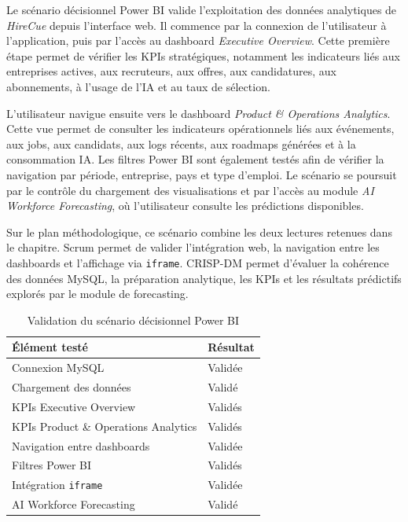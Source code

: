 Le scénario décisionnel Power BI valide l'exploitation des données analytiques de \textit{HireCue} depuis l'interface web. Il commence par la connexion de l'utilisateur à l'application, puis par l'accès au dashboard \textit{Executive Overview}. Cette première étape permet de vérifier les KPIs stratégiques, notamment les indicateurs liés aux entreprises actives, aux recruteurs, aux offres, aux candidatures, aux abonnements, à l'usage de l'IA et au taux de sélection.

L'utilisateur navigue ensuite vers le dashboard \textit{Product \& Operations Analytics}. Cette vue permet de consulter les indicateurs opérationnels liés aux événements, aux jobs, aux candidats, aux logs récents, aux roadmaps générées et à la consommation IA. Les filtres Power BI sont également testés afin de vérifier la navigation par période, entreprise, pays et type d'emploi. Le scénario se poursuit par le contrôle du chargement des visualisations et par l'accès au module \textit{AI Workforce Forecasting}, où l'utilisateur consulte les prédictions disponibles.

Sur le plan méthodologique, ce scénario combine les deux lectures retenues dans le chapitre. Scrum permet de valider l'intégration web, la navigation entre les dashboards et l'affichage via \texttt{iframe}. CRISP-DM permet d'évaluer la cohérence des données MySQL, la préparation analytique, les KPIs et les résultats prédictifs explorés par le module de forecasting.

\begin{table}[H]
\centering
\small
\renewcommand{\arraystretch}{1.3}
\begin{tabular}{|p{7cm}|p{5cm}|}
\hline
\rowcolor{headerblue}
\textbf{Élément testé} & \textbf{Résultat} \\
\hline
Connexion MySQL & Validée \\
\hline
Chargement des données & Validé \\
\hline
KPIs Executive Overview & Validés \\
\hline
KPIs Product \& Operations Analytics & Validés \\
\hline
Navigation entre dashboards & Validée \\
\hline
Filtres Power BI & Validés \\
\hline
Intégration \texttt{iframe} & Validée \\
\hline
AI Workforce Forecasting & Validé \\
\hline
\end{tabular}
\normalsize
\caption{Validation du scénario décisionnel Power BI}
\end{table}

